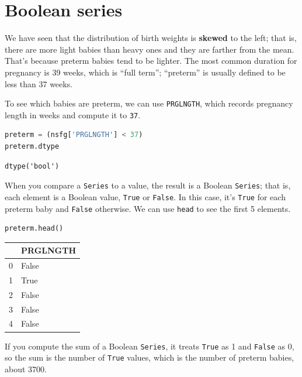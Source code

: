 \hypertarget{boolean-series}{%
\section{Boolean series}\label{boolean-series}}

We have seen that the distribution of birth weights is \textbf{skewed}
to the left; that is, there are more light babies than heavy ones and
they are farther from the mean. That's because preterm babies tend to be
lighter. The most common duration for pregnancy is 39 weeks, which is
``full term''; ``preterm'' is usually defined to be less than 37 weeks.

To see which babies are preterm, we can use
\passthrough{\lstinline!PRGLNGTH!}, which records pregnancy length in
weeks and compute it to \passthrough{\lstinline!37!}.

\begin{lstlisting}[language=Python]
preterm = (nsfg['PRGLNGTH'] < 37)
preterm.dtype
\end{lstlisting}

\begin{lstlisting}[]
dtype('bool')
\end{lstlisting}

When you compare a \passthrough{\lstinline!Series!} to a value, the
result is a Boolean \passthrough{\lstinline!Series!}; that is, each
element is a Boolean value, \passthrough{\lstinline!True!} or
\passthrough{\lstinline!False!}. In this case, it's
\passthrough{\lstinline!True!} for each preterm baby and
\passthrough{\lstinline!False!} otherwise. We can use
\passthrough{\lstinline!head!} to see the first 5 elements.

\begin{lstlisting}[language=Python]
preterm.head()
\end{lstlisting}

\begin{tabular}{ll}
\toprule
{} &  PRGLNGTH \\
\midrule
0 &     False \\
1 &      True \\
2 &     False \\
3 &     False \\
4 &     False \\
\bottomrule
\end{tabular}

If you compute the sum of a Boolean \passthrough{\lstinline!Series!}, it
treats \passthrough{\lstinline!True!} as 1 and
\passthrough{\lstinline!False!} as 0, so the sum is the number of
\passthrough{\lstinline!True!} values, which is the number of preterm
babies, about 3700.

